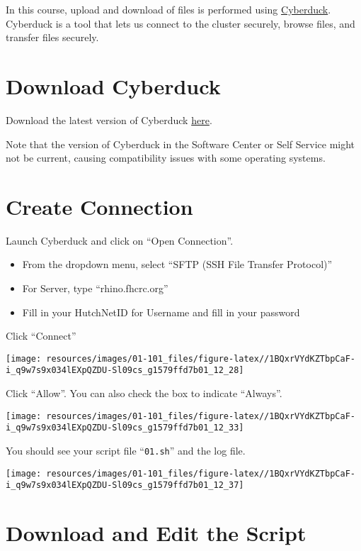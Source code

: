 \documentclass[
]{book}
\providecommand{\tightlist}{%
  \setlength{\itemsep}{0pt}\setlength{\parskip}{0pt}}
\begin{document}
In this course, upload and download of files is performed using \href{https://cyberduck.io/}{Cyberduck}. Cyberduck is a tool that lets us connect to the cluster securely, browse files, and transfer files securely.

\hypertarget{download-cyberduck}{%
\section{Download Cyberduck}\label{download-cyberduck}}

Download the latest version of Cyberduck \href{https://cyberduck.io/download/}{here}.

Note that the version of Cyberduck in the Software Center or Self Service might not be current, causing compatibility issues with some operating systems.

\hypertarget{create-connection}{%
\section{Create Connection}\label{create-connection}}

Launch Cyberduck and click on ``Open Connection''.

\begin{itemize}
\tightlist
\item
  From the dropdown menu, select ``SFTP (SSH File Transfer Protocol)''
\item
  For Server, type ``rhino.fhcrc.org''
\item
  Fill in your HutchNetID for Username and fill in your password
\end{itemize}

Click ``Connect''

\texttt{[image: resources/images/01-101\_files/figure-latex//1BQxrVYdKZTbpCaF-i\_q9w7s9x034lEXpQZDU-Sl09cs\_g1579ffd7b01\_12\_28]}

Click ``Allow''. You can also check the box to indicate ``Always''.

\texttt{[image: resources/images/01-101\_files/figure-latex//1BQxrVYdKZTbpCaF-i\_q9w7s9x034lEXpQZDU-Sl09cs\_g1579ffd7b01\_12\_33]}

You should see your script file ``\texttt{01.sh}'' and the log file.

\texttt{[image: resources/images/01-101\_files/figure-latex//1BQxrVYdKZTbpCaF-i\_q9w7s9x034lEXpQZDU-Sl09cs\_g1579ffd7b01\_12\_37]}

\hypertarget{download-and-edit-the-script}{%
\section{Download and Edit the Script}\label{download-and-edit-the-script}}
\end{document}
